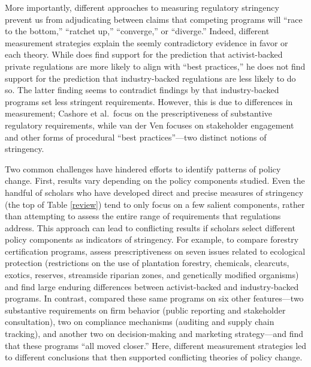 \documentclass[
      12pt,
            Review ]{article}
\begin{document}
More importantly, different approaches to measuring regulatory stringency prevent us from adjudicating between claims that competing programs will ``race to the bottom,'' ``ratchet up,'' ``converge,'' or ``diverge.'' Indeed, different measurement strategies explain the seemly contradictory evidence in favor or each theory. While \citet{VanderVen2015} does find support for the prediction that activist-backed private regulations are more likely to align with ``best practices,'' he does not find support for the prediction that industry-backed regulations are less likely to do so. The latter finding seems to contradict findings by \citet{Cashore2004} that industry-backed programs set less stringent requirements. However, this is due to differences in measurement; Cashore et al.~focus on the prescriptiveness of substantive regulatory requirements, while van der Ven focuses on stakeholder engagement and other forms of procedural ``best practices''---two distinct notions of stringency.

Two common challenges have hindered efforts to identify patterns of policy change. First, results vary depending on the policy components studied. Even the handful of scholars who have developed direct and precise measures of stringency (the top of Table \ref{review}) tend to only focus on a few salient components, rather than attempting to assess the entire range of requirements that regulations address. This approach can lead to conflicting results if scholars select different policy components as indicators of stringency. For example, to compare forestry certification programs, \citet{Cashore2004} assess prescriptiveness on seven issues related to ecological protection (restrictions on the use of plantation forestry, chemicals, clearcuts, exotics, reserves, streamside riparian zones, and genetically modified organisms) and find large enduring differences between activist-backed and industry-backed programs. In contrast, \citet{Overdevest2014} compared these same programs on six other features---two substantive requirements on firm behavior (public reporting and stakeholder consultation), two on compliance mechanisms (auditing and supply chain tracking), and another two on decision-making and marketing strategy---and find that these programs ``all moved closer.'' Here, different measurement strategies led to different conclusions that then supported conflicting theories of policy change.
\end{document}
